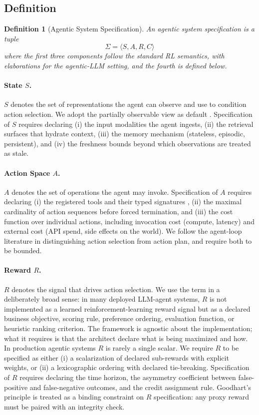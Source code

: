 \documentclass[11pt,a4paper]{article}
\newtheorem{definition}{Definition}
\theoremstyle{remark}
\begin{document}
\subsection{Definition}

\begin{definition}[Agentic System Specification]
An agentic system specification is a tuple
\[
    \Sigma = \langle S, A, R, C \rangle
\]
where the first three components follow the standard RL semantics, with elaborations for the agentic-LLM setting, and the fourth is defined below.
\end{definition}

\paragraph{State $S$.} $S$ denotes the set of representations the agent can observe and use to condition action selection. We adopt the partially observable view as default \cite{kaelbling1998pomdp}. Specification of $S$ requires declaring (i) the input modalities the agent ingests, (ii) the retrieval surfaces that hydrate context, (iii) the memory mechanism (stateless, episodic, persistent), and (iv) the freshness bounds beyond which observations are treated as stale.

\paragraph{Action Space $A$.} $A$ denotes the set of operations the agent may invoke. Specification of $A$ requires declaring (i) the registered tools and their typed signatures \cite{patil2024gorilla}, (ii) the maximal cardinality of action sequences before forced termination, and (iii) the cost function over individual actions, including invocation cost (compute, latency) and external cost (API spend, side effects on the world). We follow the agent-loop literature in distinguishing action selection from action plan, and require both to be bounded.

\paragraph{Reward $R$.} $R$ denotes the signal that drives action selection. We use the term in a deliberately broad sense: in many deployed LLM-agent systems, $R$ is not implemented as a learned reinforcement-learning reward signal but as a declared business objective, scoring rule, preference ordering, evaluation function, or heuristic ranking criterion. The framework is agnostic about the implementation; what it requires is that the architect declare what is being maximized and how. In production agentic systems $R$ is rarely a single scalar. We require $R$ to be specified as either (i) a scalarization of declared sub-rewards with explicit weights, or (ii) a lexicographic ordering with declared tie-breaking. Specification of $R$ requires declaring the time horizon, the asymmetry coefficient between false-positive and false-negative outcomes, and the credit assignment rule. Goodhart's principle \cite{manheim2019goodhart} is treated as a binding constraint on $R$ specification: any proxy reward must be paired with an integrity check.
\end{document}
